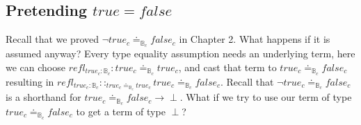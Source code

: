 \subsection{Pretending $true=false$}
 
Recall that we proved $\lnot true_{c}\doteq_{\mathbb{B}_{c}}false_{c}$ in Chapter 2.
What happens if it is assumed anyway?
Every type equality assumption needs an underlying term, here we can choose $refl_{true_{c}:\mathbb{B}_{c}}:true_{c}\doteq_{\mathbb{B}_{c}}true_{c}$, and cast that term to $true_{c}\doteq_{\mathbb{B}_{c}}false_{c}$ resulting in $refl_{true_{c}:\mathbb{B}_{c}}::_{true_{c}\doteq_{\mathbb{B}_{c}}true_{c}}true_{c}\doteq_{\mathbb{B}_{c}}false_{c}$.
Recall that $\lnot true_{c}\doteq_{\mathbb{B}_{c}}false_{c}$ is a shorthand for $true_{c}\doteq_{\mathbb{B}_{c}}false_{c}\rightarrow\perp$.
What if we try to use our term of type $true_{c}\doteq_{\mathbb{B}_{c}}false_{c}$ to get a term of type $\perp$?
 
